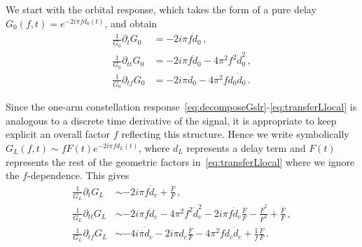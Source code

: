 \documentclass[aps,showpacs,twocolumn,
prd,superscriptaddress,nofootinbib]{revtex4-1}
\begin{document}
We start with the orbital response, which takes the form of a pure delay $G_{0}(f, t) = e^{-2 i \pi f d_{0}(t)}$, and obtain
\begin{subequations}
\begin{align}
	\frac{1}{G_{0}} \partial_{t} G_{0} &= -2i\pi f \dot{d}_{0}\,,\\
	\frac{1}{G_{0}} \partial_{tt} G_{0} &= -2i\pi f \ddot{d}_{0} - 4\pi^{2} f^{2} \dot{d}_{0}^{2} \,,\\
	\frac{1}{G_{0}} \partial_{tf} G_{0} &= -2 i \pi \dot{d}_{0} - 4\pi^{2} f d_{0} \dot{d}_{0} \,.
\end{align}
\end{subequations}

Since the one-arm constellation response~\eqref{eq:decomposeGslr}-\eqref{eq:transferLlocal} is analogous to a discrete time derivative of the signal, it is appropriate to keep explicit an overall factor $f$ reflecting this structure. Hence we write symbolically $G_{L}(f,t) \sim f F(t) e^{-2i \pi f d_{L}(t)}$, where $d_{L}$ represents a delay term and $F(t)$ represents the rest of the geometric factors in~\eqref{eq:transferLlocal} where we ignore the $f$-dependence. This gives
\begin{subequations}
\begin{align}
	\frac{1}{G_{L}} \partial_{t} G_{L} &\sim -2i\pi f \dot{d}_{c} + \frac{\dot{F}}{F}\,,\\
	\frac{1}{G_{L}} \partial_{tt} G_{L} &\sim -2i\pi f \ddot{d}_{c} - 4\pi^{2} f^{2} \dot{d}_{c}^{2} - 2i\pi f \dot{d}_{c} \frac{\dot{F}}{F} - \frac{\dot{F}^{2}}{F^{2}} + \frac{\ddot{F}}{F} \,,\\
	\frac{1}{G_{L}} \partial_{tf} G_{L} &\sim -4 i \pi \dot{d}_{c} - 2i\pi d_{c} \frac{\dot{F}}{F} - 4\pi^{2} f d_{c} \dot{d}_{c} + \frac{1}{f}\frac{\dot{F}}{F}\,.
\end{align}
\end{subequations}
\end{document}
